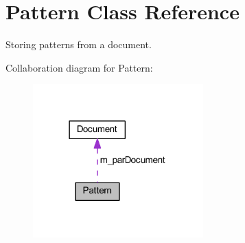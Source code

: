 \hypertarget{class_pattern}{}\section{Pattern Class Reference}
\label{class_pattern}


Storing patterns from a document.  




Collaboration diagram for Pattern:
\nopagebreak
\begin{figure}[H]
\begin{center}
\leavevmode
\includegraphics[width=186pt]{class_pattern__coll__graph}
\end{center}
\end{figure}
